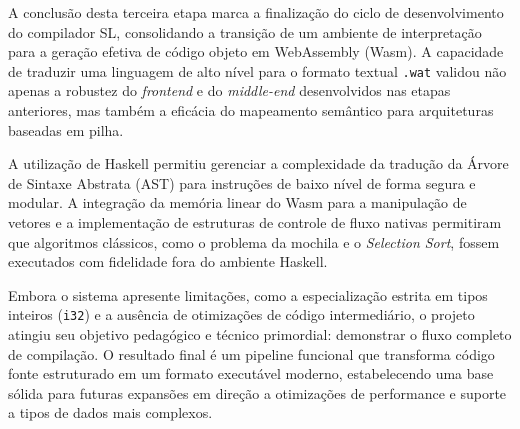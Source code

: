 \documentclass[12pt,a4paper]{article}
\begin{document}
A conclusão desta terceira etapa marca a finalização do ciclo de desenvolvimento do compilador SL, consolidando a transição de um ambiente de interpretação para a geração efetiva de código objeto em WebAssembly (Wasm). A capacidade de traduzir uma linguagem de alto nível para o formato textual \texttt{.wat} validou não apenas a robustez do \textit{frontend} e do \textit{middle-end} desenvolvidos nas etapas anteriores, mas também a eficácia do mapeamento semântico para arquiteturas baseadas em pilha.

A utilização de Haskell permitiu gerenciar a complexidade da tradução da Árvore de Sintaxe Abstrata (AST) para instruções de baixo nível de forma segura e modular. A integração da memória linear do Wasm para a manipulação de vetores e a implementação de estruturas de controle de fluxo nativas permitiram que algoritmos clássicos, como o problema da mochila e o \textit{Selection Sort}, fossem executados com fidelidade fora do ambiente Haskell.

Embora o sistema apresente limitações, como a especialização estrita em tipos inteiros (\texttt{i32}) e a ausência de otimizações de código intermediário, o projeto atingiu seu objetivo pedagógico e técnico primordial: demonstrar o fluxo completo de compilação. O resultado final é um pipeline funcional que transforma código fonte estruturado em um formato executável moderno, estabelecendo uma base sólida para futuras expansões em direção a otimizações de performance e suporte a tipos de dados mais complexos.
\end{document}
